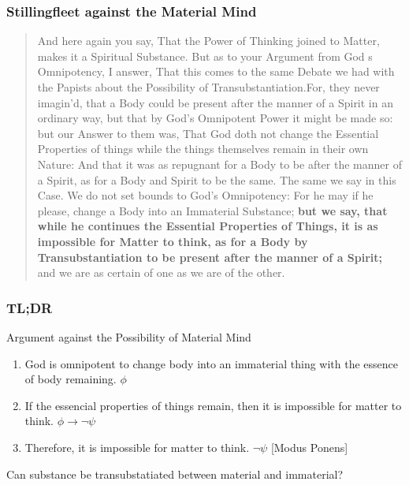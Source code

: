 \documentclass{beamer}
\begin{document}
\begin{frame}
    \frametitle{Stillingfleet against the Material Mind}
    \begin{small}
    \begin{quote}
    And here again you say, That the Power of Thinking joined to Matter, makes it a Spiritual Substance. But as to your Argument from God s Omnipotency, I answer, That this comes to the same Debate we had with the Papists about the Possibility of Transubstantiation.For, they never imagin'd, that a Body could be present after the manner of a Spirit in an ordinary way, but that by God's Omnipotent Power it might be made so: but our Answer to them was, That God doth not change the Essential Properties of things while the things themselves remain in their own Nature: And that it was as repugnant for a Body to be after the manner of a Spirit, as for a Body and Spirit to be the same. The same we say in this Case. We do not set bounds to God's Omnipotency: For he may if he please, change a Body into an Immaterial Substance; \textbf{but we say, that while he continues the Essential Properties of Things, it is as impossible for Matter to think, as for a Body by Transubstantiation to be present after the manner of a Spirit;} and we are as certain of one as we are of the other. \cite{stillingfleet-1698}
    \end{quote}
    \end{small}
\end{frame}

\begin{frame}
    \frametitle{TL;DR}
    \begin{block}{Argument against the Possibility of Material Mind}
        \begin{enumerate}
            \item God is omnipotent to change body into an immaterial thing with the essence of body remaining. $\phi$
            \item If the essencial properties of things remain, then it is impossible for matter to think. $\phi \rightarrow \neg \psi$
            \item Therefore, it is impossible for matter to think. $\neg \psi$ [Modus Ponens]
        \end{enumerate}
    \end{block}
    Can substance be transubstatiated between material and immaterial?
\end{frame}
\end{document}
